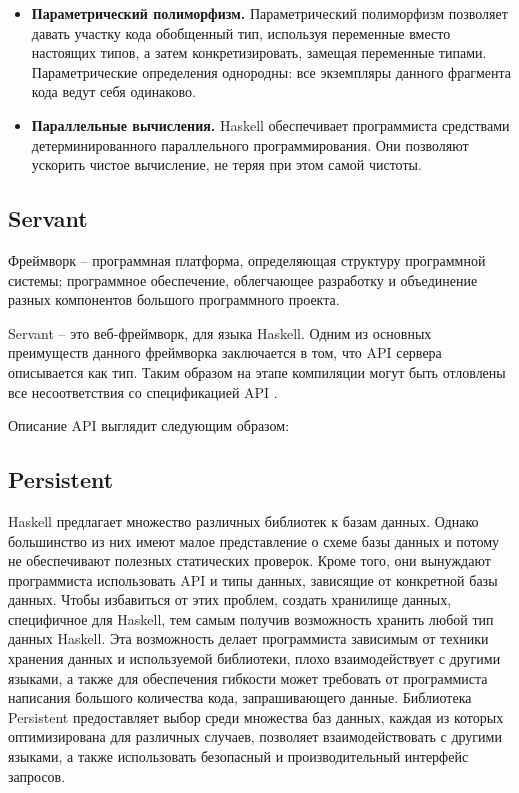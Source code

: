 \begin{itemize}
	\item \textbf{Параметрический полиморфизм.} Параметрический полиморфизм позволяет давать участку кода обобщенный тип, используя переменные вместо настоящих типов, а затем конкретизировать, замещая переменные типами. Параметрические определения однородны: все экземпляры данного фрагмента кода ведут себя одинаково.
	
	\item \textbf{Параллельные вычисления.} Haskell обеспечивает программиста средствами детерминированного параллельного программирования. Они позволяют ускорить чистое вычисление, не теряя при этом самой чистоты.
	 
\end{itemize}

\subsection{Servant}
Фреймворк -- программная платформа, определяющая структуру программной системы; программное обеспечение, облегчающее разработку и объединение разных компонентов большого программного проекта.

Servant -- это веб-фреймворк, для языка Haskell. Одним из основных преимуществ данного фреймворка заключается в том, что API сервера описывается как тип. Таким образом на этапе компиляции могут быть отловлены все несоответствия со спецификацией API \cite{s}.

Описание API выглядит следующим образом: 


\subsection{Persistent}
Haskell предлагает множество различных библиотек к базам данных. Однако большинство из них имеют малое представление о схеме базы данных и потому не обеспечивают полезных статических проверок. Кроме того, они вынуждают программиста использовать API и типы данных, зависящие от конкретной базы данных. Чтобы избавиться от этих проблем, создать хранилище данных, специфичное для Haskell, тем самым получив возможность хранить любой тип данных Haskell. Эта возможность делает программиста зависимым от техники хранения данных и используемой библиотеки, плохо взаимодействует с другими языками, а также для обеспечения гибкости может требовать от программиста написания большого количества кода, запрашивающего данные. Библиотека Persistent предоставляет выбор среди множества баз данных, каждая из которых оптимизирована для различных случаев, позволяет взаимодействовать с другими языками, а также использовать безопасный и производительный интерфейс запросов.

